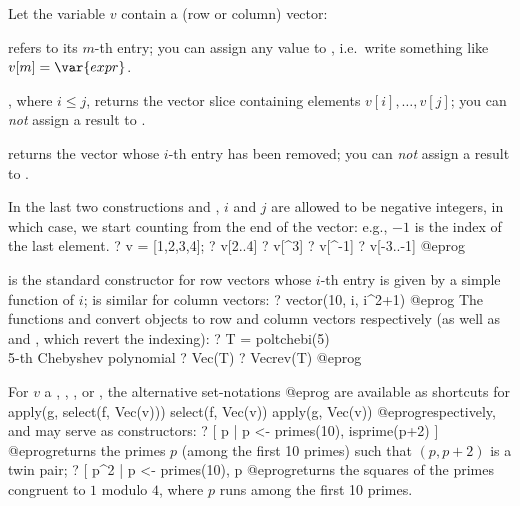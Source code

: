 Let the variable $v$ contain a (row or column) vector:

\item {} refers to its $m$-th entry; you can assign any value to
,  i.e.~write something like $v[m]=\var{expr}$.

\item {}, where $i \leq j$, returns the vector slice containing
elements $v[i],\dots, v[j]$; you can \emph{not} assign a result to
.

\item {} returns the vector whose $i$-th entry has been removed;
you can \emph{not} assign a result to .

\noindent In the last two constructions  and ,
$i$ and $j$ are allowed to be negative integers, in which case, we start
counting from the end of the vector: e.g., $-1$ is the index of the last
element.
\bprog
? v = [1,2,3,4];
? v[2..4]
? v[^3]
? v[^-1]
? v[-3..-1]
@eprog

  is the standard constructor for row vectors
 whose $i$-th entry is given by a simple function of $i$; 
 is similar for column vectors:
 \bprog
 ? vector(10, i, i^2+1)
 @eprog
 The functions  and  convert objects to row and column
vectors respectively (as well as  and , which revert
the indexing):
 \bprog
 ? T = poltchebi(5)   \\ 5-th Chebyshev polynomial
 ? Vec(T)
 ? Vecrev(T)
 @eprog

 For $v$ a , , ,
  or , the alternative set-notations
 \bprog
 [g(x) | x <- v, f(x)]
 [x | x <- v, f(x)]
 [g(x) | x <- v]
 @eprog\noindent
 are available as shortcuts for
 \bprog
 apply(g, select(f, Vec(v)))
 select(f, Vec(v))
 apply(g, Vec(v))
 @eprog\noindent respectively, and may serve as  constructors:
 \bprog
 ? [ p | p <- primes(10), isprime(p+2) ]
 @eprog\noindent returns the primes $p$ (among the first 10 primes) such
 that $(p, p+2)$ is a twin pair;
 \bprog
 ? [ p^2 | p <- primes(10), p %
 @eprog\noindent returns the squares of the primes congruent to $1$ modulo $4$,
 where $p$ runs among the first 10 primes.

